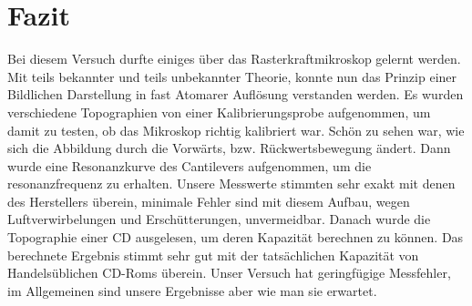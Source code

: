 \chapter{Fazit}

Bei diesem Versuch durfte einiges über das Rasterkraftmikroskop gelernt werden.
Mit teils bekannter und teils unbekannter Theorie, konnte nun das Prinzip einer Bildlichen Darstellung in fast Atomarer Auflösung verstanden werden.
Es wurden verschiedene Topographien von einer Kalibrierungsprobe aufgenommen, um damit zu testen, ob das Mikroskop richtig kalibriert war.
Schön zu sehen war, wie sich die Abbildung durch die Vorwärts, bzw. Rückwertsbewegung ändert.
Dann wurde eine Resonanzkurve des Cantilevers aufgenommen, um die resonanzfrequenz zu erhalten.
Unsere Messwerte stimmten sehr exakt mit denen des Herstellers überein, minimale Fehler sind mit diesem Aufbau, wegen Luftverwirbelungen und Erschütterungen, unvermeidbar.
Danach wurde die Topographie einer CD ausgelesen, um deren Kapazität berechnen zu können.
Das berechnete Ergebnis stimmt sehr gut mit der tatsächlichen Kapazität von Handelsüblichen CD-Roms überein.
Unser Versuch hat geringfügige Messfehler, im Allgemeinen sind unsere Ergebnisse aber wie man sie erwartet.
